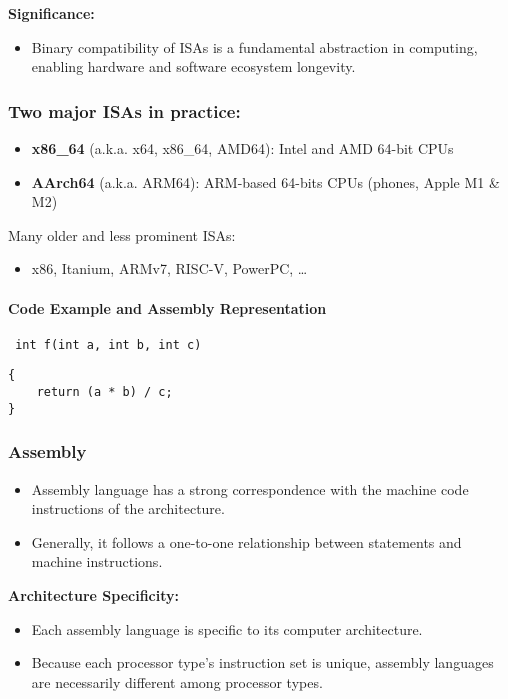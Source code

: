 \documentclass[12pt]{article}
\begin{document}
\textbf{Significance:}
\begin{itemize}
    \item Binary compatibility of ISAs is a fundamental abstraction in computing, enabling hardware and software ecosystem longevity.
\end{itemize}

\subsubsection{Two major ISAs in practice:}
\begin{itemize}
    \item \textbf{x86\_64} (a.k.a. x64, x86\_64, AMD64): Intel\textsuperscript{\textregistered} and AMD\textsuperscript{\textregistered} 64-bit CPUs
    \item \textbf{AArch64} (a.k.a. ARM64): ARM\textsuperscript{\textregistered}-based 64-bits CPUs (phones, Apple M1 \& M2)
\end{itemize}

Many older and less prominent ISAs:
\begin{itemize}
    \item x86, Itanium, ARMv7, RISC-V, PowerPC, \ldots
\end{itemize}

\paragraph{Code Example and Assembly Representation}
\texttt{ int f(int a, int b, int c)}
\begin{lstlisting}
{
    return (a * b) / c;
}
\end{lstlisting}


\subsubsection{Assembly}
\begin{itemize}
    \item Assembly language has a strong correspondence with the machine code instructions of the architecture.
    \item Generally, it follows a one-to-one relationship between statements and machine instructions.
\end{itemize}

\textbf{Architecture Specificity:}
\begin{itemize}
    \item Each assembly language is specific to its computer architecture.
    \item Because each processor type's instruction set is unique, assembly languages are necessarily different among processor types.
\end{itemize}
\end{document}
